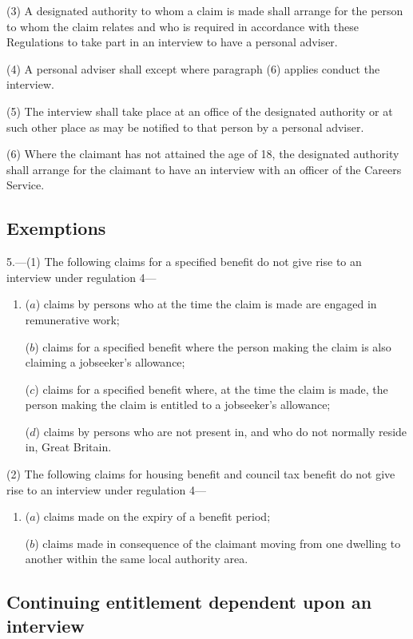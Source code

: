 \documentclass[12pt,a4paper]{article}
\begin{document}
(3) A designated authority to whom a claim is made shall arrange for the person to whom the claim relates and who is required in accordance with these Regulations to take part in an interview to have a personal adviser.

(4) A personal adviser shall except where paragraph (6) applies conduct the interview.

(5) The interview shall take place at an office of the designated authority or at such other place as may be notified to that person by a personal adviser.

(6) Where the claimant has not attained the age of 18, the designated authority shall arrange for the claimant to have an interview with an officer of the Careers Service.

\subsection[5. Exemptions]{Exemptions}

5.—(1)  The following claims for a specified benefit do not give rise to an interview under regulation 4—
\begin{enumerate}\item[]
($a$) claims by persons who at the time the claim is made are engaged in remunerative work;

($b$) claims for a specified benefit where the person making the claim is also claiming a jobseeker’s allowance;

($c$) claims for a specified benefit where, at the time the claim is made, the person making the claim is entitled to a jobseeker’s allowance;

($d$) claims by persons who are not present in, and who do not normally reside in, Great Britain.
\end{enumerate}

(2) The following claims for housing benefit and council tax benefit do not give rise to an interview under regulation 4—
\begin{enumerate}\item[]
($a$) claims made on the expiry of a benefit period;

($b$) claims made in consequence of the claimant moving from one dwelling to another within the same local authority area.
\end{enumerate}

\subsection[6. Continuing entitlement dependent upon an interview]{Continuing entitlement dependent upon an interview}
\end{document}

